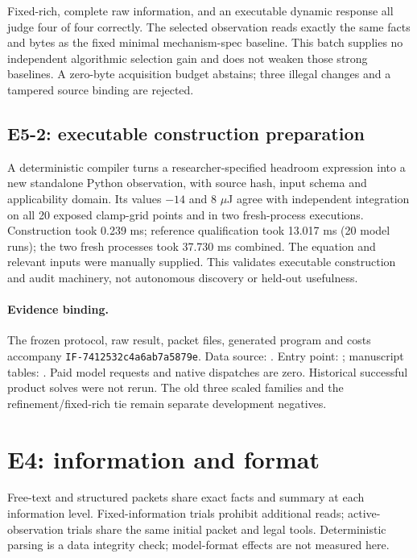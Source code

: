 \documentclass[10pt]{article}
\begin{document}
Fixed-rich, complete raw information, and an executable dynamic response all judge four of four correctly. The selected observation reads exactly the same facts and bytes as the fixed minimal mechanism-spec baseline. This batch supplies no independent algorithmic selection gain and does not weaken those strong baselines. A zero-byte acquisition budget abstains; three illegal changes and a tampered source binding are rejected.

\subsection{E5-2: executable construction preparation}
A deterministic compiler turns a researcher-specified headroom expression into a new standalone Python observation, with source hash, input schema and applicability domain. Its values $-14$ and $8$ $\mu$J agree with independent integration on all 20 exposed clamp-grid points and in two fresh-process executions. Construction took 0.239 ms; reference qualification took 13.017 ms (20 model runs); the two fresh processes took 37.730 ms combined. The equation and relevant inputs were manually supplied. This validates executable construction and audit machinery, not autonomous discovery or held-out usefulness.

\paragraph{Evidence binding.}
The frozen protocol, raw result, packet files, generated program and costs accompany \texttt{IF-7412532c4a6ab7a5879e}. Data source: . Entry point: ; manuscript tables: . Paid model requests and native dispatches are zero. Historical successful product solves were not rerun. The old three scaled families and the refinement/fixed-rich tie remain separate development negatives.
\section{E4: information and format}
Free-text and structured packets share exact facts and summary at each information level. Fixed-information trials prohibit additional reads; active-observation trials share the same initial packet and legal tools. Deterministic parsing is a data integrity check; model-format effects are not measured here.
\end{document}
